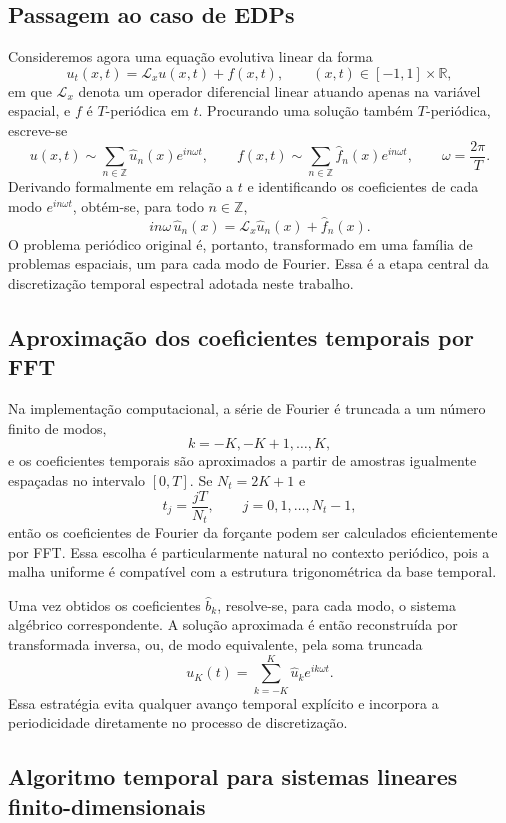 \subsection{Passagem ao caso de EDPs}

Consideremos agora uma equação evolutiva linear da forma
\[
u_t(x,t)=\mathcal{L}_x u(x,t)+f(x,t),
\qquad (x,t)\in [-1,1]\times\mathbb{R},
\]
em que \(\mathcal{L}_x\) denota um operador diferencial linear atuando apenas na variável espacial, e \(f\) é \(T\)-periódica em \(t\). Procurando uma solução também \(T\)-periódica, escreve-se
\[
u(x,t)\sim \sum_{n\in\mathbb{Z}}\widehat{u}_n(x)e^{in\omega t},
\qquad
f(x,t)\sim \sum_{n\in\mathbb{Z}}\widehat{f}_n(x)e^{in\omega t},
\qquad
\omega=\frac{2\pi}{T}.
\]
Derivando formalmente em relação a \(t\) e identificando os coeficientes de cada modo \(e^{in\omega t}\), obtém-se, para todo \(n\in\mathbb{Z}\),
\[
in\omega\,\widehat{u}_n(x)=\mathcal{L}_x\widehat{u}_n(x)+\widehat{f}_n(x).
\]
O problema periódico original é, portanto, transformado em uma família de problemas espaciais, um para cada modo de Fourier. Essa é a etapa central da discretização temporal espectral adotada neste trabalho.

\subsection{Aproximação dos coeficientes temporais por FFT}

Na implementação computacional, a série de Fourier é truncada a um número finito de modos,
\[
k=-K,-K+1,\dots,K,
\]
e os coeficientes temporais são aproximados a partir de amostras igualmente espaçadas no intervalo \([0,T]\). Se \(N_t=2K+1\) e
\[
t_j=\frac{jT}{N_t},
\qquad j=0,1,\dots,N_t-1,
\]
então os coeficientes de Fourier da forçante podem ser calculados eficientemente por FFT. Essa escolha é particularmente natural no contexto periódico, pois a malha uniforme é compatível com a estrutura trigonométrica da base temporal.

Uma vez obtidos os coeficientes \(\widehat{b}_k\), resolve-se, para cada modo, o sistema algébrico correspondente. A solução aproximada é então reconstruída por transformada inversa, ou, de modo equivalente, pela soma truncada
\[
u_{K}(t)=\sum_{k=-K}^{K}\widehat{u}_k e^{ik\omega t}.
\]
Essa estratégia evita qualquer avanço temporal explícito e incorpora a periodicidade diretamente no processo de discretização.


\subsection{Algoritmo temporal para sistemas lineares finito-dimensionais}
\label{subsec:algoritmo-temporal-sistemas}

